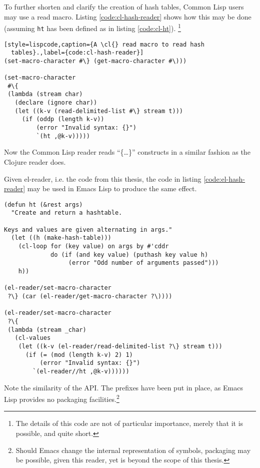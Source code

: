 \documentclass[a4paper,10pt,twoside]{article}
\newcommand{\el}{Emacs Lisp}
\newcommand{\cl}{Common Lisp}
\newcommand{\elr}{el-reader}
\newcommand{\fun}[1]{\texttt{#1}}
\begin{document}
To further shorten and clarify the creation of hash tables, \cl{} users may use
a read macro. Listing \ref{code:cl-hash-reader} shows how this may be done
(assuming \fun{ht} has been defined as in listing \ref{code:cl-ht}).
\footnote{The details of this code are not of particular importance, merely that
  it is possible, and quite short.}

\begin{lstlisting}[style=lispcode,caption={A \cl{} read macro to read hash
  tables}.,label={code:cl-hash-reader}]
(set-macro-character #\} (get-macro-character #\)))

(set-macro-character
 #\{
 (lambda (stream char)
   (declare (ignore char))
   (let ((k-v (read-delimited-list #\} stream t)))
     (if (oddp (length k-v))
         (error "Invalid syntax: {}")
         `(ht ,@k-v)))))
\end{lstlisting}

Now the \cl{} reader reads ``\{\ldots{}\}'' constructs in a similar fashion as
the Clojure reader does.

Given \elr{}, i.e. the code from this thesis, the code in listing
\ref{code:el-hash-reader} may be used in \el{} to produce the same effect.

\begin{lstlisting}[style=lispcode,caption={An equivalent read macro using
  \elr{}.}, label={code:el-hash-reader}]
(defun ht (&rest args)
  "Create and return a hashtable.

Keys and values are given alternating in args."
  (let ((h (make-hash-table)))
    (cl-loop for (key value) on args by #'cddr
             do (if (and key value) (puthash key value h)
                  (error "Odd number of arguments passed")))
    h))

(el-reader/set-macro-character
 ?\} (car (el-reader/get-macro-character ?\))))

(el-reader/set-macro-character
 ?\{
 (lambda (stream _char)
   (cl-values
    (let ((k-v (el-reader/read-delimited-list ?\} stream t)))
      (if (= (mod (length k-v) 2) 1)
          (error "Invalid syntax: {}")
        `(el-reader//ht ,@k-v))))))
\end{lstlisting}

Note the similarity of the API.  The prefixes have been put in place, as \el{}
provides no packaging facilities.\footnote{Should Emacs change the internal
  representation of symbols, packaging may be possible, given this reader, yet
  is beyond the scope of this thesis.}
\end{document}
